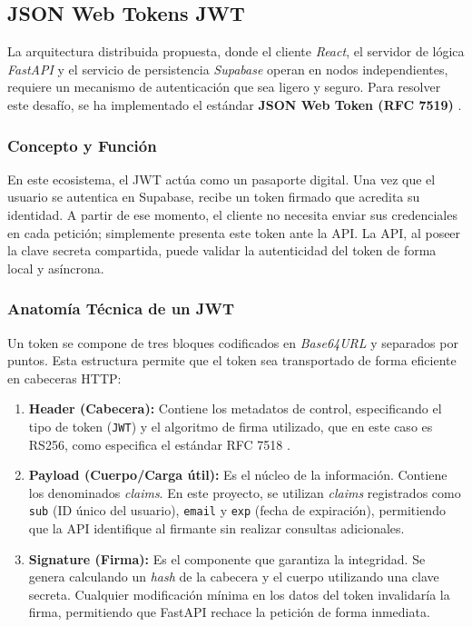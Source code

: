 \documentclass[11pt, a4paper]{report}
\theoremstyle{definition}
\begin{document}
\subsection{JSON Web Tokens JWT}
\label{subsec:jwt_identidad}

La arquitectura distribuida propuesta, donde el cliente \textit{React}, el servidor de lógica \textit{FastAPI} y el servicio de persistencia \textit{Supabase} operan en nodos independientes, requiere un mecanismo de autenticación que sea ligero y seguro. Para resolver este desafío, se ha implementado el estándar \textbf{JSON Web Token (RFC 7519)} \cite{ietf_jwt}.

\subsubsection{Concepto y Función}

En este ecosistema, el JWT actúa como un pasaporte digital. Una vez que el usuario se autentica en Supabase, recibe un token firmado que acredita su identidad. A partir de ese momento, el cliente no necesita enviar sus credenciales en cada petición; simplemente presenta este token ante la API. La API, al poseer la clave secreta compartida, puede validar la autenticidad del token de forma local y asíncrona.

\subsubsection{Anatomía Técnica de un JWT}

Un token se compone de tres bloques codificados en \textit{Base64URL} y separados por puntos. Esta estructura permite que el token sea transportado de forma eficiente en cabeceras HTTP:

\begin{enumerate}
    \item \textbf{Header (Cabecera):} Contiene los metadatos de control, especificando el tipo de token (\texttt{JWT}) y el algoritmo de firma utilizado, que en este caso es RS256, como especifica el estándar RFC 7518 \cite{rfc7518}.
    \item \textbf{Payload (Cuerpo/Carga útil):} Es el núcleo de la información. Contiene los denominados \textit{claims}. En este proyecto, se utilizan \textit{claims} registrados como \texttt{sub} (ID único del usuario), \texttt{email} y \texttt{exp} (fecha de expiración), permitiendo que la API identifique al firmante sin realizar consultas adicionales.
    \item \textbf{Signature (Firma):} Es el componente que garantiza la integridad. Se genera calculando un \textit{hash} de la cabecera y el cuerpo utilizando una clave secreta. Cualquier modificación mínima en los datos del token invalidaría la firma, permitiendo que FastAPI rechace la petición de forma inmediata.
\end{enumerate}
\end{document}
